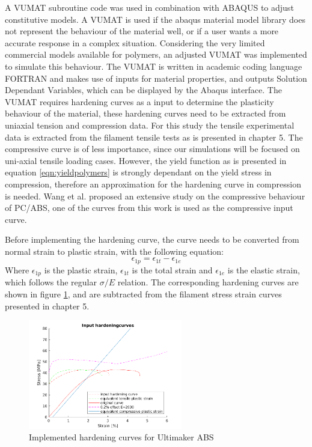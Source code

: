 A VUMAT subroutine code was used in combination with ABAQUS to adjust constitutive models. A VUMAT is used if the abaqus material model library does not represent the behaviour of the material well, or if a user wants a more accurate response in a complex situation\cite{SimuliaWritingAbaqus}. Considering the very limited commercial models available for polymers, an adjusted VUMAT was implemented to simulate this behaviour. The VUMAT is written in academic coding language FORTRAN and makes use of inputs for material properties, and outputs Solution Dependant Variables, which can be displayed by the Abaqus interface. The VUMAT requires hardening curves as a input to determine the plasticity behaviour of the material, these hardening curves need to be extracted from uniaxial tension and compression data. For this study the tensile experimental data is extracted from the filament tensile tests as is presented in chapter 5. The compressive curve is of less importance, since our simulations will be focused on uni-axial tensile loading cases. However, the yield function as is presented in equation \ref{eqn:yieldpolymers} is strongly dependant on the yield stress in compression, therefore an approximation for the hardening curve in compression is needed. Wang et al. \cite{Wang2016ExperimentalRates} proposed an extensive study on the compressive behaviour of PC/ABS, one of the curves from this work is used as the compressive input curve. 

Before implementing the hardening curve, the curve needs to be converted from normal strain to plastic strain, with the following equation:
\begin{equation} \label{eqn:toplastic}
\epsilon_{1p}=\epsilon_{1t}-\epsilon_{1e}
\end{equation}
Where $\epsilon_{1p}$ is the plastic strain, $\epsilon_{1t}$ is the total strain and $\epsilon_{1e}$ is the elastic strain, which follows the regular $\sigma/E$ relation. The corresponding hardening curves are shown in figure \ref{fig:hardening}, and are subtracted from the filament stress strain curves presented in chapter 5.

\begin{figure}[H]
    \centering
    \includegraphics[width=0.60\textwidth]{chapter_7_non-elasticmodelling/figures/Hardening.png}
    \caption{Implemented hardening curves for Ultimaker ABS}
    \label{fig:hardening}
\end{figure}

